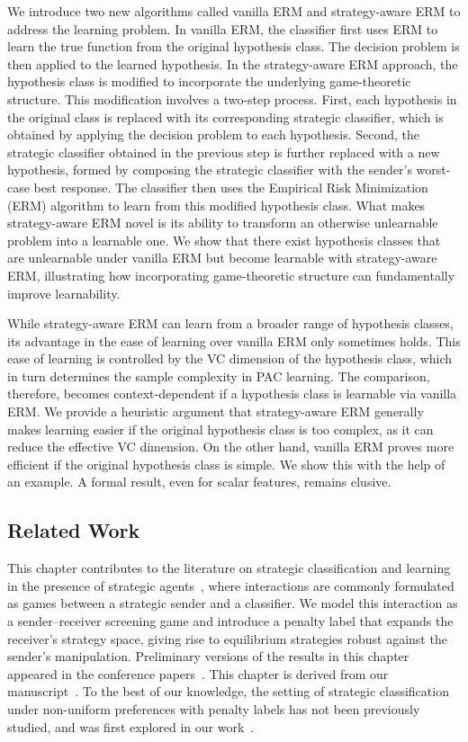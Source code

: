 We introduce two new algorithms called vanilla ERM and strategy-aware ERM to address the learning problem. In vanilla ERM, the classifier first uses ERM to learn the true function from the original hypothesis class. The decision problem is then applied to the learned hypothesis. In the strategy-aware ERM approach, the hypothesis class is modified to incorporate the underlying game-theoretic structure. This modification involves a two-step process. First, each hypothesis in the original class is replaced with its corresponding strategic classifier, which is obtained by applying the decision problem to each hypothesis. Second, the strategic classifier obtained in the previous step is further replaced with a new hypothesis, formed by composing the strategic classifier with the sender’s worst-case best response. The classifier then uses the Empirical Risk Minimization (ERM) algorithm to learn from this modified hypothesis class. What makes strategy-aware ERM novel is its ability to transform an otherwise unlearnable problem into a learnable one. We show that there exist hypothesis classes that are unlearnable under vanilla ERM but become learnable with strategy-aware ERM, illustrating how incorporating game-theoretic structure can fundamentally improve learnability.

While strategy-aware ERM can learn from a broader range of hypothesis classes, its advantage in the ease of learning over vanilla ERM only sometimes holds. This ease of learning is controlled by the VC dimension of the hypothesis class, which in turn determines the sample complexity in PAC learning. The comparison, therefore, becomes context-dependent if a hypothesis class is learnable via vanilla ERM. We provide a heuristic argument that strategy-aware ERM generally makes learning easier if the original hypothesis class is too complex, as it can reduce the effective VC dimension. On the other hand, vanilla ERM proves more efficient if the original hypothesis class is simple. We show this with the help of an example. A formal result, even for scalar features, remains elusive.

\subsection{Related Work}
This chapter contributes to the literature on strategic classification and learning in the presence of strategic agents~\cite{bruckner2011stackelberg,ghalme2021strategic,bechavod2022information,cohen2024bayesian,jagadeesan2021alternative,dalvi2004adversarial}, where interactions are commonly formulated as games between a strategic sender and a classifier. We model this interaction as a sender--receiver screening game and introduce a penalty label that expands the receiver's strategy space, giving rise to equilibrium strategies robust against the sender's manipulation. Preliminary versions of the results in this chapter appeared in the conference papers~\cite{singh22strategic,singh2024optimal}. This chapter is derived from our manuscript~\cite{singh2025strategic}. To the best of our knowledge, the setting of strategic classification under non-uniform preferences with penalty labels has not been previously studied, and was first explored in our work~\cite{singh2025strategic}.

